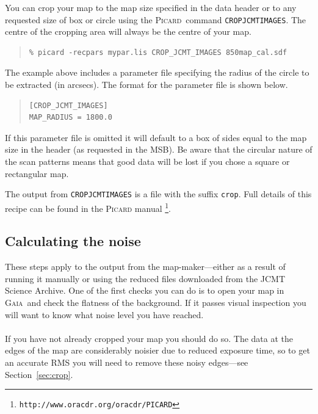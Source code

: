 \documentclass[twoside,11pt]{article}
\newcommand{\htmladdnormallink}[2]{#1}
\newcommand{\htmlref}[2]{#1}
\newcommand{\latex}[1]{#1}
\newcommand{\latexhtml}[2]{#1}
\newcommand{\xref}[3]{#1}
\newcommand{\xlabel}[1]{}
\renewcommand{\_}{\texttt{\symbol{95}}}
\newenvironment{myquote}{\begin{quote}\begin{small}}{\end{small}\end{quote}}
\newcommand{\gaia}{\xref{\textsc{Gaia}}{sun214}{}}
\newcommand{\picard}{\xref{\textsc{Picard}}{sun265}{}}
\newcommand{\drrecipe}[1]{\texttt{#1}}
\newcommand{\param}[1]{\texttt{#1}}
\newcommand{\cref}[3]{\latexhtml{#1~\ref{#2}}{\htmlref{#3}{#2}}}
\begin{document}
You can crop your map to the map size specified in the data header or
to any requested size of box or circle using the \picard\ command
\xref{\param{CROP\_JCMT\_IMAGES}}{sun265}{CROP_JCMT_IMAGES}. The centre
of the cropping area will always be the centre of your map.
\begin{myquote}
\begin{verbatim}
% picard -recpars mypar.lis CROP_JCMT_IMAGES 850map_cal.sdf
\end{verbatim}
\end{myquote}
The example above includes a parameter file specifying the radius of
the circle to be extracted (in arcsecs). The format for the parameter
file is shown below.
\begin{myquote}
\begin{verbatim}
[CROP_JCMT_IMAGES]
MAP_RADIUS = 1800.0
\end{verbatim}
\end{myquote}
If this parameter file is omitted it will default to a box of sides
equal to the map size in the header (as requested in the MSB). Be
aware that the circular nature of the scan patterns means that good
data will be lost if you chose a square or rectangular map.

The output from \drrecipe{CROP\_JCMT\_IMAGES} is a file with the suffix
\texttt{\_crop}. Full details of this recipe can be found in the
\htmladdnormallink{\textsc{Picard} manual}{http://www.oracdr.org/oracdr/PICARD}
\latex{\footnote{\texttt{http://www.oracdr.org/oracdr/PICARD}}}.

\subsection{\xlabel{noise}Calculating the noise}

These steps apply to the output from the map-maker---either as a
result of running it manually or using the reduced files downloaded
from the \htmladdnormallink{JCMT Science
Archive.}{http://www3.cadc-ccda.hia-iha.nrc-cnrc.gc.ca/jcmt/} One of
the first checks you can do is to open your map in \gaia\ and check
the flatness of the background. If it passes visual inspection you
will want to know what noise level you have reached.
\\ \\
If you have not already cropped your map you should do so. The data at
the edges of the map are considerably noisier due to reduced exposure
time, so to get an accurate RMS you will need to remove these noisy
edges---see \cref{Section}{sec:crop}{Cropping your map}.
\end{document}
